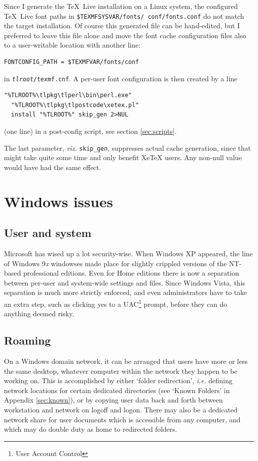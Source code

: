 \documentclass[11pt,a4paper,oneside]{report}
\def\TL{\TeX~Live}
\def\XeTeX{Xe\TeX}
\def\dbr{\discretionary{}{}{}}
\begin{document}
Since I generate the \TL{} installation on a Linux system, the
configured \TL{} font paths in \texttt{\$TEXMFSYSVAR/\dbr fonts/\dbr
  conf/\dbr fonts.conf} do not match the target installation. Of
course this generated file can be hand-edited, but I preferred to
leave this file alone and move the font cache configuration files
also to a user-writable location with another line:
\begin{verbatim}
FONTCONFIG_PATH = $TEXMFVAR/fonts/conf
\end{verbatim}
in \texttt{\emph{tlroot}/texmf.cnf}. A per-user font configuration
is then created by a line
\begin{verbatim}
"%TLROOT%\tlpkg\tlperl\bin\perl.exe"
  "%TLROOT%\tlpkg\tlpostcode\xetex.pl"
  install "%TLROOT%" skip_gen 2>NUL
\end{verbatim}
(one line) in a post-config script, see section \ref{sec:scripts}.

The last parameter, \emph{viz.}  \texttt{skip\_gen}, suppresses
actual cache generation, since that might take quite some time and
only benefit \XeTeX{} users. Any non-null value would have had the
same effect.

\appendix

\chapter{Windows issues}

\section{User and system}
\label{sec:usersys}

Microsoft has wised up a lot security-wise. When Windows XP
appeared, the line of Windows 9\emph{x} windowses made place for
slightly crippled versions of the NT-based professional
editions. Even for Home editions there is now a separation between
per-user and system-wide settings and files. Since Windows Vista,
this separation is much more strictly enforced, and even
administrators have to take an extra step, such as clicking yes to a
UAC\footnote{User Account Control} prompt, before they can do
anything deemed risky.

\section{Roaming}
\label{sec:roam}

On a Windows domain network, it can be arranged that users have more
or less the same desktop, whatever computer within the network they
happen to be working on. This is accomplished by either `folder
redirection', \emph{i.e.} defining network locations for certain
dedicated directories (see `Known Folders' in Appendix
\ref{sec:known}), or by copying user data back and forth between
workstation and network on logoff and logon. There may also be a
dedicated network share for user documents which is accessible from
any computer, and which may do double duty as home to redirected
folders.
\end{document}
